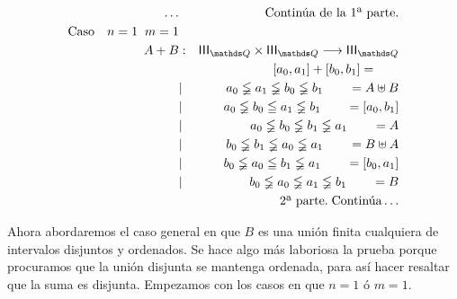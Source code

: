 \documentclass[final,12pt,a4paper,twoside,fleqn]{extbook}
\newcommand{\fromto}{\ensuremath{\longrightarrow}}
\theoremstyle{definition}
\theoremstyle{remark}
\begin{document}
\begin{eqnarray}
\nonumber
\ldots&&\text{Continúa de la 1ª parte.}\\
\text{Caso}\quad n = 1 \;\; m = 1 &&\\
A + B &:& \IIIQ \times \IIIQ \fromto \IIIQ\\
      &&\left[a_0,a_1\right] + \left[b_0,b_1\right] = \qquad\\
      &|& a_0 \lneqq a_1 \lneqq b_0 \lneqq b_1\qquad = A \uplus B\\ 
      &|& a_0 \lneqq b_0 \leqq a_1 \lneqq b_1\qquad = \left[a_0,b_1\right]\\ 
      &|& a_0 \lneqq b_0 \lneqq b_1 \lneqq a_1\qquad = A\\ 
      &|& b_0 \lneqq b_1 \lneqq a_0 \lneqq a_1\qquad = B \uplus A\\ 
      &|& b_0 \lneqq a_0 \leqq b_1 \lneqq a_1\qquad = \left[b_0,a_1\right]\\ 
      &|& b_0 \lneqq a_0 \lneqq a_1 \lneqq b_1\qquad = B\\ \nonumber
      &&\text{2ª parte.}\;\text{Continúa}\ldots
\end{eqnarray}



	Ahora abordaremos el caso general en que \(B\) es una unión finita
cualquiera de intervalos disjuntos y ordenados. Se hace algo más laboriosa la
prueba porque procuramos que la unión disjunta se mantenga ordenada, para así
hacer resaltar que la suma es disjunta. Empezamos con los casos en que
\(n=1\) ó \(m=1\).
\end{document}

